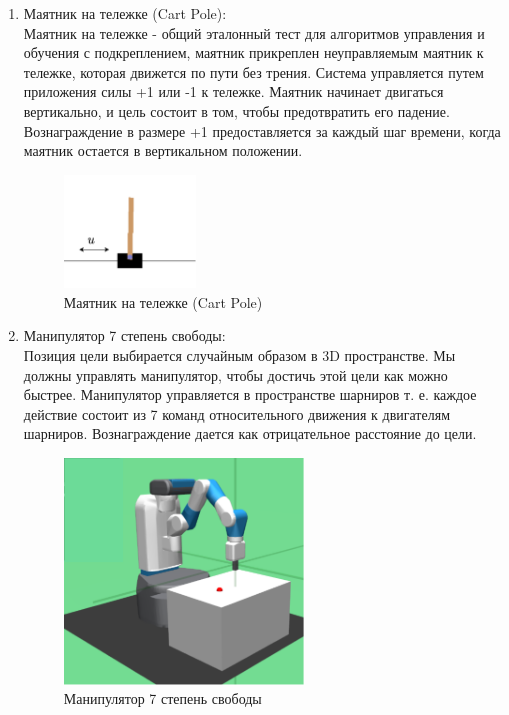 \documentclass[a4paper,12pt]{article}
\begin{document}
\begin{enumerate}[noitemsep]
    \item Маятник на тележке (Cart Pole):\\
Маятник на тележке - общий эталонный тест для алгоритмов управления и обучения с подкреплением, маятник прикреплен неуправляемым маятник к тележке, которая движется по пути без трения. Система управляется путем приложения силы +1 или -1 к тележке. Маятник начинает двигаться вертикально, и цель состоит в том, чтобы предотвратить его падение. Вознаграждение в размере +1 предоставляется за каждый шаг времени, когда маятник остается в вертикальном положении.
\begin{figure}[H]
    \centering
    \includegraphics[height=3cm,trim={0 2cm 0 2cm},clip]{img/cart.png}
    \caption{Маятник на тележке (Cart Pole)}
    \label{fig:my_label}
\end{figure}
\item Манипулятор 7 степень свободы:\\
Позиция цели выбирается случайным образом в 3D пространстве. Мы должны управлять манипулятор, чтобы достичь этой цели как можно быстрее. Манипулятор управляется в пространстве шарниров т. е. каждое действие состоит из 7 команд относительного движения к двигателям шарниров. Вознаграждение дается как отрицательное расстояние до цели.
\begin{figure}[H]
    \centering
    \includegraphics[height=6cm,trim={0 2cm 0 2cm},clip]{img/arm.png}
    \caption{Манипулятор 7 степень свободы}
    \label{fig:my_label}
\end{figure}

\newpage
\end{enumerate}
\end{document}
